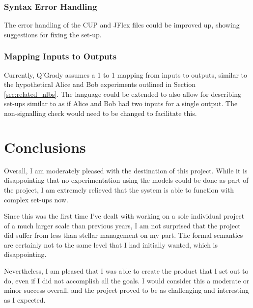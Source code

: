 \documentclass[report.tex]{subfiles}
\begin{document}
\subsubsection{Syntax Error Handling} %
\label{ssub:syntax_error_handling}
The error handling of the CUP and JFlex files could be improved up, showing
suggestions for fixing the set-up.

\subsubsection{Mapping Inputs to Outputs} %
\label{ssub:mapping_inputs_to_outputs}
Currently, Q'Grady assumes a 1 to 1 mapping from inputs to outputs, similar to
the hypothetical Alice and Bob experiments outlined in Section
\ref{sec:related_nlbs}. The language could be extended to also allow for
describing set-ups similar to as if Alice and Bob had two inputs for a single
output. The non-signalling check would need to be changed to facilitate this.


\section{Conclusions} %
\label{sec:conclusions}
Overall, I am moderately pleased with the destination of this project. While it
is disappointing that no experimentation using the models could be done as part
of the project, I am extremely relieved that the system is able to function with
complex set-ups now.

Since this was the first time I've dealt with working on a sole individual
project of a much larger scale than previous years, I am not surprised that the
project did suffer from less than stellar management on my part. The formal
semantics are certainly not to the same level that I had initially wanted, which
is disappointing.

Nevertheless, I am pleased that I was able to create the product that I set out
to do, even if I did not accomplish all the goals. I would consider this a
moderate or minor success overall, and the project proved to be as challenging
and interesting as I expected.

\newpage
\end{document}
